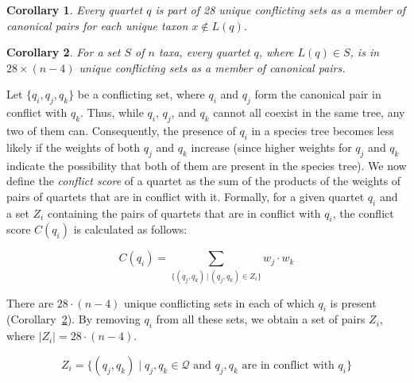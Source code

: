 \documentclass[10pt,a4paper]{article}
\newtheorem{corollary}{Corollary}[theorem]
\begin{document}
\begin{corollary}
\label{cor:unique-conflict}
Every quartet $q$ is part of 28 unique conflicting sets as a member of canonical pairs for each unique taxon $x \notin L(q) $.
\end{corollary}


\begin{corollary}
\label{cor:total_unique_conflict}
For a set $S$ of $n$ taxa, every quartet $q$, where $L(q) \in S$, is in $28 \times (n-4)$ unique conflicting sets as a member of canonical pairs.
\end{corollary}



Let $ \{q_i, q_j, q_k \} $ be a conflicting set, where $q_i$ and $q_j$ form the canonical pair in conflict with $q_k$. Thus, while $q_i$, $q_j$, and $q_k$ cannot all coexist in the same tree, any two of them can. Consequently, the presence of $q_i$ in a species tree becomes less likely if the weights of both $q_j$ and $q_k$ increase (since higher weights for $q_j$ and $q_k$ indicate the possibility that both of them are present in the species tree). We now define the \textit{conflict score} of a quartet as the sum of the products of the weights of pairs of quartets that are in conflict with it. Formally, for a given quartet $q_i$ and a set $Z_i$ containing the pairs of quartets that are in conflict with $q_i$, the conflict score $C(q_i)$ is calculated as follows:

\vspace{-10pt}
\begin{equation}
\label{eq:conflict_score}
C(q_i) = \sum_{\{(q_j, q_k) \,|\, (q_j, q_k) \in Z_i\}} w_j \cdot w_k
\end{equation}

There are $28 \cdot (n - 4)$ unique conflicting sets in each of which $q_i$ is present (Corollary~\ref{cor:total_unique_conflict}). By removing  $q_i$ from all these sets, we obtain a set of pairs $Z_i$, where $|Z_i| = 28 \cdot (n-4)$. %


$$
Z_i = \{(q_j, q_k) \mid q_j, q_k \in \mathcal{Q} \text{ and } q_j, q_k \text{ are in conflict with } q_i\}
$$

%
\end{document}
